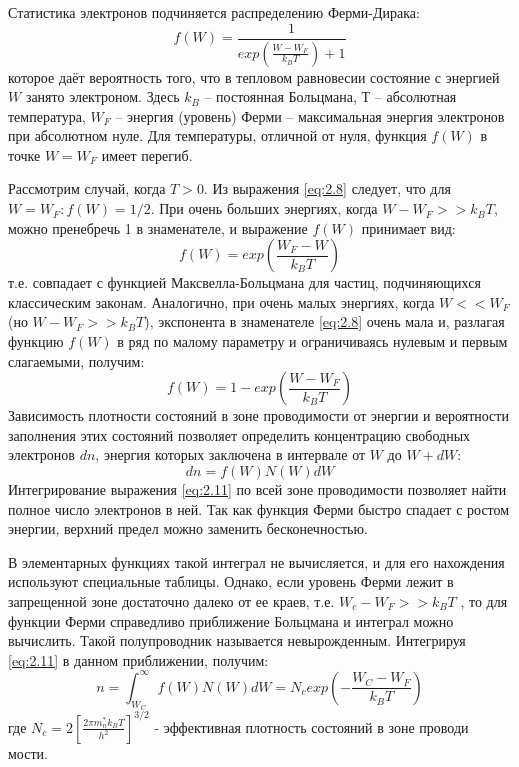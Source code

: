Статистика электронов подчиняется распределению Ферми-Дирака:   
\begin{equation}
	f(W) = \frac{1}{exp (\frac{W-W_F}{k_B T})+1}
	\label{eq:2.8}
\end{equation}
которое даёт вероятность того, что в тепловом равновесии состояние с энергией $W$ занято электроном. Здесь $k_B$ –
постоянная Больцмана, $Т$ – абсолютная температура, $W_F$ – энергия (уровень) Ферми – максимальная энергия электронов при
абсолютном нуле. Для температуры, отличной от нуля, функция $f(W)$ в точке $W = W_F$ имеет перегиб.

Рассмотрим случай, когда $T > 0$. Из выражения \eqref{eq:2.8} следует, что для $W=W_F: f(W) =1/2$. При очень больших энергиях, когда 
$ W-W_F>> k_B T $, можно пренебречь 1 в знаменателе, и выражение $f(W)$ принимает вид:
\begin{equation}
	f(W) = exp (\frac{W_F-W}{k_B T})
	\label{eq:2.9}
\end{equation} 
т.е. совпадает с функцией Максвелла-Больцмана для частиц, подчиняющихся классическим законам. Аналогично, при очень
малых энергиях, когда $W<<W_F$ (но $W-W_F>>k_B T$), экспонента в знаменателе \eqref{eq:2.8} очень мала и, разлагая функцию $f(W)$ в ряд по
малому параметру и ограничиваясь нулевым и первым слагаемыми, получим: 
\begin{equation}
	f(W) = 1 - exp( \frac{W-W_F}{k_BT})
	\label{eq:2.10}
\end{equation}
Зависимость плотности состояний в зоне проводимости от энергии и вероятности заполнения этих состояний позволяет
определить концентрацию свободных электронов $dn$, энергия которых заключена в интервале от $W$ до $W+dW$:
\begin{equation}
	dn = f(W) N(W)dW
	\label{eq:2.11}
\end{equation}
Интегрирование выражения \eqref{eq:2.11} по всей зоне проводимости позволяет найти полное число электронов в ней. Так как функция
Ферми быстро спадает с ростом энергии, верхний предел можно заменить бесконечностью. 

В элементарных функциях такой интеграл не вычисляется, и для его нахождения используют специальные таблицы. Однако, если
уровень Ферми лежит в запрещенной зоне достаточно далеко от ее краев, т.е. $W_c - W_F>>k_B T$ , то для функции Ферми
справедливо приближение Больцмана и интеграл можно вычислить. Такой полупроводник называется невырожденным. Интегрируя
\eqref{eq:2.11} в данном приближении, получим: 
\begin{equation}
	n=\int_{W_{C}}^{\infty} f(W) N(W) d W=N_{c} exp(-\frac{W_C-W_F}{k_B T})
	\label{eq:2.12}
\end{equation}
где $N_{c}=2\left[\frac{2 \pi m_{n}^{*} k_{B} T}{h^{2}}\right]^{3 / 2}$ - эффективная плотность состояний в зоне проводи
мости.

